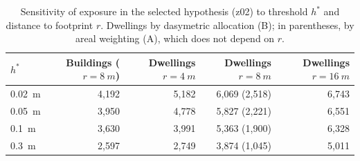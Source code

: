 \begin{table}[htbp]\centering\small
\caption{Sensitivity of exposure in the selected hypothesis (z02) to threshold $h^*$ and distance to footprint $r$. Dwellings by dasymetric allocation (B); in parentheses, by areal weighting (A), which does not depend on $r$.}\label{tab:sensibilidad}
\begin{tabular}{lrrrr}\toprule
$h^*$ & Buildings ($r=\SI{8}{m}$) & Dwellings $r=\SI{4}{m}$ & Dwellings $r=\SI{8}{m}$ & Dwellings $r=\SI{16}{m}$\\\midrule
\SI{0.02}{m} & 4,192 & 5,182 & 6,069 (2,518) & 6,743\\
\SI{0.05}{m} & 3,950 & 4,778 & 5,827 (2,221) & 6,551\\
\SI{0.1}{m} & 3,630 & 3,991 & 5,363 (1,900) & 6,328\\
\SI{0.3}{m} & 2,597 & 2,749 & 3,874 (1,045) & 5,011\\
\bottomrule\end{tabular}\end{table}
